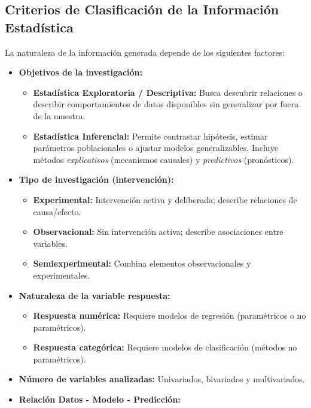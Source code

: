 \documentclass[
  spanish,
  letterpaper,
  DIV=11,
  numbers=noendperiod]{scrreprt}
\providecommand{\tightlist}{%
  \setlength{\itemsep}{0pt}\setlength{\parskip}{0pt}}
\begin{document}
\subsection{Criterios de Clasificación de la Información
Estadística}\label{criterios-de-clasificaciuxf3n-de-la-informaciuxf3n-estaduxedstica}

La naturaleza de la información generada depende de los siguientes
factores:

\begin{itemize}
\tightlist
\item
  \textbf{Objetivos de la investigación:}

  \begin{itemize}
  \tightlist
  \item
    \textbf{Estadística Exploratoria / Descriptiva:} Busca descubrir
    relaciones o describir comportamientos de datos disponibles sin
    generalizar por fuera de la muestra.
  \item
    \textbf{Estadística Inferencial:} Permite contrastar hipótesis,
    estimar parámetros poblacionales o ajustar modelos generalizables.
    Incluye métodos \emph{explicativos} (mecanismos causales) y
    \emph{predictivos} (pronósticos).
  \end{itemize}
\item
  \textbf{Tipo de investigación (intervención):}

  \begin{itemize}
  \tightlist
  \item
    \textbf{Experimental:} Intervención activa y deliberada; describe
    relaciones de causa/efecto.
  \item
    \textbf{Observacional:} Sin intervención activa; describe
    asociaciones entre variables.
  \item
    \textbf{Semiexperimental:} Combina elementos observacionales y
    experimentales.
  \end{itemize}
\item
  \textbf{Naturaleza de la variable respuesta:}

  \begin{itemize}
  \tightlist
  \item
    \textbf{Respuesta numérica:} Requiere modelos de regresión
    (paramétricos o no paramétricos).
  \item
    \textbf{Respuesta categórica:} Requiere modelos de clasificación
    (métodos no paramétricos).
  \end{itemize}
\item
  \textbf{Número de variables analizadas:} Univariados, bivariados y
  multivariados.
\item
  \textbf{Relación Datos - Modelo - Predicción:}


\end{itemize}
\end{document}
